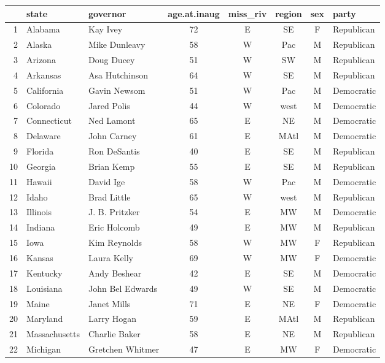 \documentclass[11pt]{article}
\begin{document}
\newpage

\begin{table}[ht]
\centering
\begin{tabular}{rll c cccl}
  \hline
 & state & governor & age.at.inaug & miss\_riv & region & sex & party \\ 
  \hline
1 & Alabama & Kay Ivey & 72 & E & SE & F & Republican \\ 
  2 & Alaska & Mike Dunleavy & 58 & W & Pac & M & Republican \\ 
  3 & Arizona & Doug Ducey & 51 & W & SW & M & Republican \\ 
  4 & Arkansas & Asa Hutchinson & 64 & W & SE & M & Republican \\ 
  5 & California & Gavin Newsom & 51 & W & Pac & M & Democratic \\ 
  6 & Colorado & Jared Polis & 44 & W & west & M & Democratic \\ 
  7 & Connecticut & Ned Lamont & 65 & E & NE & M & Democratic \\ 
  8 & Delaware & John Carney & 61 & E & MAtl & M & Democratic \\ 
  9 & Florida & Ron DeSantis & 40 & E & SE & M & Republican \\ 
  10 & Georgia & Brian Kemp & 55 & E & SE & M & Republican \\ 
  11 & Hawaii & David Ige & 58 & W & Pac & M & Democratic \\ 
  12 & Idaho & Brad Little & 65 & W & west & M & Republican \\ 
  13 & Illinois & J. B. Pritzker & 54 & E & MW & M & Democratic \\ 
  14 & Indiana & Eric Holcomb & 49 & E & MW & M & Republican \\ 
  15 & Iowa & Kim Reynolds & 58 & W & MW & F & Republican \\ 
  16 & Kansas & Laura Kelly & 69 & W & MW & F & Democratic \\ 
  17 & Kentucky & Andy Beshear & 42 & E & SE & M & Democratic \\ 
  18 & Louisiana & John Bel Edwards & 49 & W & SE & M & Democratic \\ 
  19 & Maine & Janet Mills & 71 & E & NE & F & Democratic \\ 
  20 & Maryland & Larry Hogan & 59 & E & MAtl & M & Republican \\ 
  21 & Massachusetts & Charlie Baker & 58 & E & NE & M & Republican \\ 
  22 & Michigan & Gretchen Whitmer & 47 & E & MW & F & Democratic \\ 

\end{tabular}
\end{table}
\end{document}
